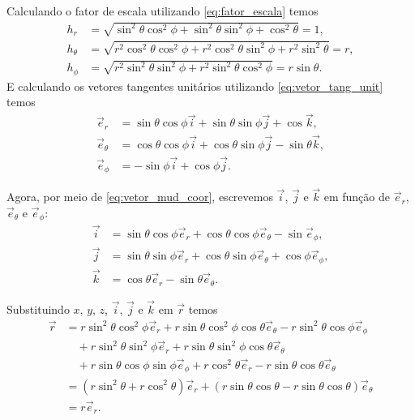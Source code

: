 \documentclass[a4paper,12pt, leqno, answers]{exam}
\begin{document}
\begin{questions}
\begin{solution}
        Calculando o fator de escala utilizando \eqref{eq:fator_escala} temos
        \begin{align*}
            h_r &= \sqrt{\sin^2 \theta \cos^2 \phi + \sin^2 \theta \sin^2 \phi + \cos^2 \theta} = 1, \\
            h_\theta &= \sqrt{r^2 \cos^2 \theta \cos^2 \phi + r^2 \cos^2 \theta \sin^2 \phi + r^2 \sin^2 \theta} = r, \\
            h_\phi &= \sqrt{r^2 \sin^2 \theta \sin^2 \phi + r^2 \sin^2 \theta \cos^2 \phi} = r \sin \theta.
        \end{align*}
        E calculando os vetores tangentes unit\'{a}rios utilizando \eqref{eq:vetor_tang_unit} temos
        \begin{align*}
            \vec{e}_r &= \sin \theta \cos \phi \vec{i} + \sin \theta \sin \phi \vec{j} + \cos \vec{k}, \\
            \vec{e}_\theta &= \cos \theta \cos \phi \vec{i} + \cos \theta \sin \phi \vec{j} - \sin \theta \vec{k}, \\
            \vec{e}_\phi &= -\sin \phi \vec{i} + \cos \phi \vec{j}.
        \end{align*}
        
        Agora, por meio de \eqref{eq:vetor_mud_coor}, escrevemos $\vec{i}$, $\vec{j}$ e $\vec{k}$ em fun\c{c}\~{a}o de $\vec{e}_r$, $\vec{e}_\theta$ e $\vec{e}_\phi$:
        \begin{align*}
            \vec{i} &= \sin \theta \cos \phi \vec{e}_r + \cos \theta \cos \phi \vec{e}_\theta - \sin \vec{e}_\phi, \\
            \vec{j} &= \sin \theta \sin \phi \vec{e}_r + \cos \theta \sin \phi \vec{e}_\theta + \cos \phi \vec{e}_\phi, \\
            \vec{k} &= \cos \theta \vec{e}_r - \sin \theta \vec{e}_\theta.
        \end{align*}

        Substituindo $x$, $y$, $z$, $\vec{i}$, $\vec{j}$ e $\vec{k}$ em $\vec{r}$ temos
        \begin{align*}
            \vec{r} &= r \sin^2 \theta \cos^2 \phi \vec{e}_r + r \sin \theta \cos^2 \phi \cos \theta \vec{e}_\theta - r \sin^2 \theta \cos \phi \vec{e}_\phi \\
            & \quad + r \sin^2 \theta \sin^2 \phi \vec{e}_r + r \sin \theta \sin^2 \phi \cos \theta \vec{e}_\theta \\
            & \quad + r \sin \theta \cos \phi \sin \phi \vec{e}_\phi + r \cos^2 \theta \vec{e}_r - r \sin \theta \cos \theta \vec{e}_\theta \\
            &= \left( r \sin^2 \theta + r \cos^2 \theta \right) \vec{e}_r + \left( r \sin \theta \cos \theta - r \sin \theta \cos \theta \right) \vec{e}_\theta \\
            &= r \vec{e}_r.
        \end{align*}


\end{solution}
\end{questions}
\end{document}
